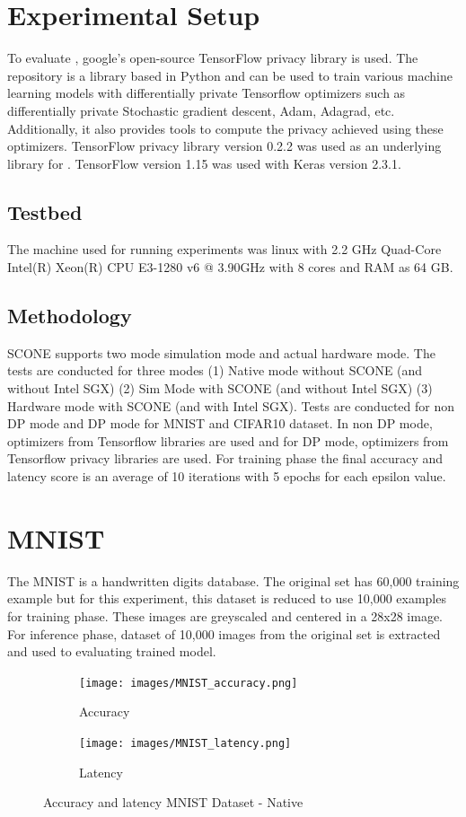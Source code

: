 \section{Experimental Setup}
To evaluate \dip, google's open-source TensorFlow privacy library is used. The repository \cite{11} is a library based in Python and can be used to train various machine learning models with differentially private Tensorflow optimizers such as differentially private Stochastic gradient descent, Adam, Adagrad, etc. Additionally, it also provides tools to compute the privacy achieved using these optimizers. TensorFlow privacy library \cite{11} version 0.2.2 was used as an underlying library for \dip. TensorFlow version 1.15 was used with Keras version 2.3.1. 
\subsection{Testbed}
The machine used for running experiments was linux with 2.2 GHz Quad-Core Intel(R) Xeon(R) CPU E3-1280 v6 @ 3.90GHz with 8 cores and RAM as 64 GB. 
\subsection{Methodology}
SCONE supports two mode simulation mode and actual hardware mode. The tests are conducted for three modes (1) Native mode without SCONE (and without Intel SGX) (2) Sim Mode with SCONE (and without Intel SGX) (3) Hardware mode with SCONE (and with Intel SGX). Tests are conducted for non DP mode and DP mode for MNIST and CIFAR10 dataset. In non DP mode, optimizers from Tensorflow libraries are used and for DP mode, optimizers from Tensorflow privacy libraries are used. For training phase the final accuracy and latency score is an average of 10 iterations with 5 epochs for each epsilon value.
\section{MNIST}
The MNIST is a handwritten digits database\cite{12}. The original set has 60,000 training example but for this experiment, this dataset is reduced to use 10,000 examples for training phase. These images are greyscaled and centered in a 28x28 image. For inference phase, dataset of 10,000 images from the original set is extracted and used to evaluating trained model.
\begin{figure}
     \begin{subfigure}{0.5\textwidth}
         \texttt{[image: images/MNIST\_accuracy.png]}
         \caption{Accuracy}
         \label{default}
     \end{subfigure}
     \begin{subfigure}{0.5\textwidth}
         \texttt{[image: images/MNIST\_latency.png]}
         \caption{Latency}
         \label{default}
     \end{subfigure}
        \caption{Accuracy and latency MNIST Dataset - Native}
        \label{default}
\end{figure}

